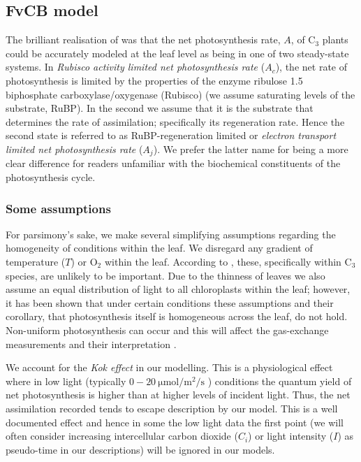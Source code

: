 \documentclass[11pt]{article} %
\begin{document}
\subsection{FvCB model}
The brilliant realisation of \citet{Farquharbiochemicalmodelphotosynthetic1980} was that the net photosynthesis rate, $A$, of C$_3$ plants could be accurately modeled at the leaf level as being in one of two steady-state systems. In \emph{Rubisco activity limited net photosynthesis rate} ($A_c$), the net rate of photosynthesis is limited by the properties of the enzyme ribulose 1.5 biphosphate carboxylase/oxygenase (Rubisco) (we assume saturating levels of the substrate, RuBP). In the second we assume that it is the substrate that determines the rate of assimilation; specifically its regeneration rate. Hence the second state is referred to as RuBP-regeneration limited or \emph{electron transport limited net photosynthesis rate} ($A_j$)\cite{YinUsingcombinedmeasurements2009}. We prefer the latter name for being a more clear difference for readers unfamiliar with the biochemical constituents of the photosynthesis cycle.

\subsubsection{Some assumptions} \label{Assumptions}
For parsimony's sake, we make several simplifying assumptions regarding the homogeneity of conditions within the leaf. We disregard any gradient of temperature ($T$) or O$_2$ within the leaf. According to \citet{CaemmererBiochemicalmodelsleaf2000}, these, specifically within C$_3$ species, are unlikely to be important. Due to the thinness of leaves we also assume an equal distribution of light to all chloroplasts within the leaf; however, it has been shown that under certain conditions these assumptions and their corollary, that photosynthesis itself is homogeneous across the leaf, do not hold. Non-uniform photosynthesis can occur and this will affect the gas-exchange measurements and their interpretation \cite{TerashimaAnatomynonuniformleaf1992}.

We account for the \emph{Kok effect} in our modelling. This is a physiological effect where in low light (typically $0-20\SI{}{\micro \mol \per \m \squared \per \s}$ \cite{TcherkezTrackingoriginsKok2017}) conditions the quantum yield of net photosynthesis is higher than at higher levels of incident light. Thus, the net assimilation recorded tends to escape description by our model. This is a well documented effect \cite{TcherkezTrackingoriginsKok2017}\cite{SharpKokEffectQuantum1984}\cite{HeskelBringingKokeffect2013} and hence in some the low light data the first point (we will often consider increasing intercellular carbon dioxide ($C_i$) or light intensity ($I$) as pseudo-time in our descriptions) will be ignored in our models.
\end{document}
